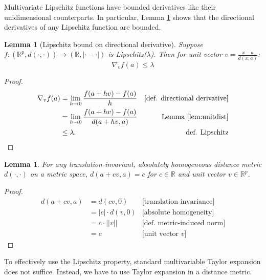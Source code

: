 \documentclass{article}
\newtheorem{lemma}[theorem]{Lemma}
\begin{document}
Multivariate Lipschitz functions have bounded derivatives like their unidimensional counterparts.
In particular, Lemma \ref{lem:lipbdsdd} shows that the directional derivatives of any Lipschitz function are bounded.
\begin{lemma}[Lipschitz bound on directional derivative]
\label{lem:lipbdsdd}
Suppose $f: (\mathbb{R}^p, d(\cdot, \cdot)) \to (\mathbb{R}, |\cdot - \cdot|)$ is Lipschitz($\lambda$).
Then for unit vector $v = \frac{x-a}{d(x,a)}$:
\begin{equation*}
    \nabla_v f(a) \leq \lambda
\end{equation*}
\end{lemma}
\begin{proof}
\begin{align*}
    \nabla_v f(a) 
    &= \lim_{h \to 0} \frac{f(a + hv) - f(a)}{h} &\text{[def. directional derivative]}\\
    &= \lim_{h \to 0} \frac{f(a + hv) - f(a)}{d(a + hv, a)} &\text{Lemma }\ref{lem:unitdist}\\
    &\leq \lambda. &\text{def. Lipschitz}
\end{align*}
\end{proof}

\begin{lemma}
\label{lem:unitdist}
For any translation-invariant, absolutely homogeneous distance metric $d(\cdot, \cdot)$ on a metric space, $d(a + cv, a) = c$ for $c \in \mathbb{R}$ and unit vector $v \in \mathbb{R}^p$.
\end{lemma}
\begin{proof}
\begin{align*}
    d(a + cv, a)
    &= d(cv, 0) &\text{[translation invariance]} \\
    &= |c| \cdot d(v, 0) &\text{[absolute homogeneity]} \\
    &= c \cdot ||v|| &\text{[def. metric-induced norm]} \\
    &= c &\text{[unit vector } v\text{]}
\end{align*}
\end{proof}

To effectively use the Lipschitz property, standard multivariable Taylor expansion does not suffice.
Instead, we have to use Taylor expansion in a distance metric.
\end{document}
